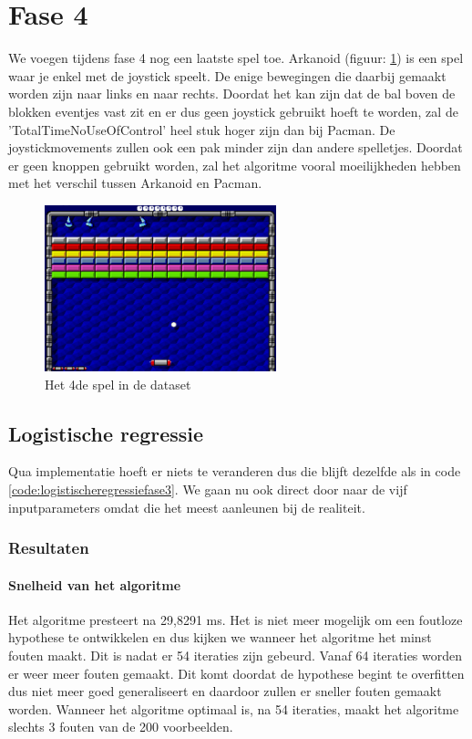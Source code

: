 
\newpage
\section{Fase 4}
\label{sec:Fase4}

We voegen tijdens fase 4 nog een laatste spel toe. Arkanoid (figuur: \ref{fig:akranoid}) is een spel waar je enkel met de joystick speelt. De enige bewegingen die daarbij gemaakt worden zijn naar links en naar rechts. Doordat het kan zijn dat de bal boven de blokken eventjes vast zit en er dus geen joystick gebruikt hoeft te worden, zal de 'TotalTimeNoUseOfControl' heel stuk hoger zijn dan bij Pacman. De joystickmovements zullen ook een pak minder zijn dan andere spelletjes. Doordat er geen knoppen gebruikt worden, zal het algoritme vooral moeilijkheden hebben met het verschil tussen Arkanoid en Pacman.

\begin{figure}[]
	\centering
	\includegraphics[width=0.6\textwidth]{img/arkanoid.png}
	\caption{Het 4de spel in de dataset}
	\label{fig:akranoid}
\end{figure}

\subsection{Logistische regressie}
\label{sec:Logistischeregressie-fase4}

Qua implementatie hoeft er niets te veranderen dus die blijft dezelfde als in code \ref{code:logistischeregressiefase3}. We gaan nu ook direct door naar de vijf inputparameters omdat die het meest aanleunen bij de realiteit. 

\subsubsection{Resultaten}
\paragraph{Snelheid van het algoritme} 
Het algoritme presteert na 29,8291 ms. Het is niet meer mogelijk om een foutloze hypothese te ontwikkelen en dus kijken we wanneer het algoritme het minst fouten maakt. Dit is nadat er 54 iteraties zijn gebeurd. Vanaf 64 iteraties worden er weer meer fouten gemaakt. Dit komt doordat de hypothese begint te overfitten dus niet meer goed generaliseert en daardoor zullen er sneller fouten gemaakt worden.
Wanneer het algoritme optimaal is, na 54 iteraties, maakt het algoritme slechts 3 fouten van de 200 voorbeelden.

